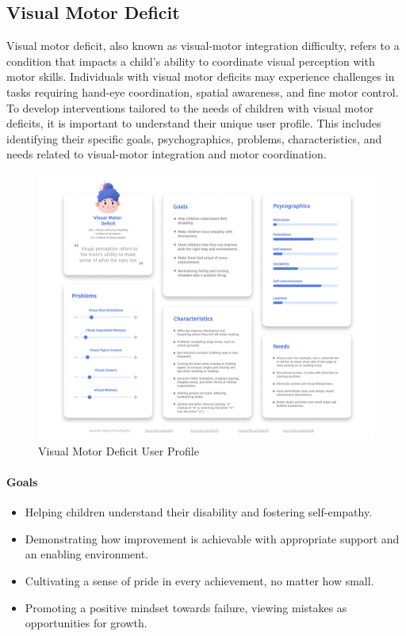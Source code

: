 \subsection{Visual Motor Deficit}
Visual motor deficit, also known as visual-motor integration difficulty, refers to a condition that impacts a child's ability to coordinate visual perception with motor skills. Individuals with visual motor deficits may experience challenges in tasks requiring hand-eye coordination, spatial awareness, and fine motor control. To develop interventions tailored to the needs of children with visual motor deficits, it is important to understand their unique user profile. This includes identifying their specific goals, psychographics, problems, characteristics, and needs related to visual-motor integration and motor coordination.

\begin{figure}[H]
    \centering
    \includegraphics[width=0.8\linewidth]{Chapters/figma/Visual Motor Deficit.png}
    \caption{Visual Motor Deficit User Profile}
    \label{fig:VMDUserProfile}
\end{figure}

\paragraph{Goals}
\begin{itemize}
    \item Helping children understand their disability and fostering self-empathy.
    \item Demonstrating how improvement is achievable with appropriate support and an enabling environment.
    \item Cultivating a sense of pride in every achievement, no matter how small.
    \item Promoting a positive mindset towards failure, viewing mistakes as opportunities for growth.
\end{itemize}

